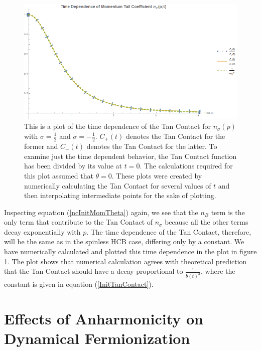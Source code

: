 \documentclass[onecolumn,english,aps,pra]{revtex4}
\begin{document}
\begin{figure}[h] 
\includegraphics[scale=0.55]{"../Plots/SpinorTanContactTimeDependence"}
\caption{This is a plot of the time dependence of the Tan Contact for $n_\sigma(p)$ with $\sigma = \frac{1}{2}$ and $\sigma = -\frac{1}{2}$. $C_+(t)$ denotes the Tan Contact for the former and $C_-(t)$ denotes the Tan Contact for the latter. To examine just the time dependent behavior, the Tan Contact function has been divided by its value at $t = 0$. The calculations required for this plot assumed that $\theta = 0$. These plots were created by numerically calculating the Tan Contact for several values of $t$ and then interpolating intermediate points for the sake of plotting.}
\label{fig:TanContactTimeDep}
\end{figure}

Inspecting equation (\ref{ncInitMomTheta}) again, we see that the $n_B$ term is the only term that contribute to the Tan Contact of $n_\sigma$ because all the other terms decay exponentially with $p$. The time dependence of the Tan Contact, therefore, will be the same as in the spinless HCB case, differing only by a constant. We have numerically calculated and plotted this time dependence in the plot in figure \ref{fig:TanContactTimeDep}. The plot shows that numerical calculation agrees with theoretical prediction that the Tan Contact should have a decay proportional to $\frac{1}{b(t)^3}$, where the constant is given in equation (\ref{InitTanContact}).

\section{Effects of Anharmonicity on Dynamical Fermionization}
\end{document}
